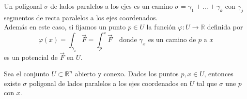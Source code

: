 \begin{observación}
Un poligonal $\sigma$ de lados paralelos a los ejes es un camino $\sigma = \gamma_1 + \ldots + \gamma_k$ con $\gamma_j$ segmentos de recta paralelos a los ejes coordenados.\\
Además en este caso, si fijamos un punto $p \in U$ la función $\varphi: U \to \mathbb{R}$ definida por
\[
    \varphi(x) = \int_{\gamma_x} \vec{F} = \int_{p}^{x} \vec{F} \quad \text{donde } \gamma_x \text{ es un camino de } p \text{ a } x
\]
es un potencial de $\vec{F}$ en $U$.
\end{observación}

\begin{lema}
    Sea el conjunto $U \subset \mathbb{R}^n$ abierto y conexo. Dados los puntos $p, x \in U$, entonces existe $\sigma$ poligonal de lados paralelos a los ejes coordenados en $U$ tal que $\sigma$ une $p$ con $x$.
\end{lema}

